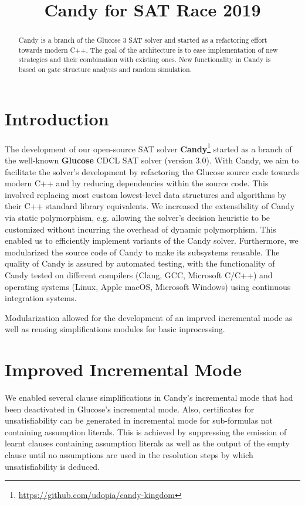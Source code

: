 \documentclass[conference]{IEEEtran}
\title{Candy for SAT Race 2019}
\author{\IEEEauthorblockN{Markus Iser\IEEEauthorrefmark{1}
and Felix Kutzner\IEEEauthorrefmark{2}}
\IEEEauthorblockA{Karlsruhe Institute of Technology (KIT)\\
Karlsruhe, Germany\\
\IEEEauthorrefmark{1}markus.iser@kit.edu,
\IEEEauthorrefmark{2}felix@kutzner.io}}
\begin{document}
\maketitle

\begin{abstract}
Candy is a branch of the Glucose 3 SAT solver and started as a refactoring effort towards modern C++.
The goal of the architecture is to ease implementation of new strategies and their combination with existing ones. 
New functionality in Candy is based on gate structure analysis and random simulation. 
\end{abstract}


\section{Introduction}
The development of our open-source SAT solver \textbf{Candy}\footnote{\url{https://github.com/udopia/candy-kingdom}} started as a branch of the well-known \textbf{Glucose} \cite{Audemard:2009:Glucose,Niklas:2003:Minisat} CDCL SAT solver (version 3.0).
With Candy, we aim to facilitate the solver's development by refactoring the Glucose source code towards modern C++ and by reducing dependencies within the source code.
This involved replacing most custom lowest-level data structures and algorithms by their C++ standard library equivalents.
We increased the extensibility of Candy via static polymorphism, e.g. allowing the solver's decision heuristic to be customized without incurring the overhead of dynamic polymorphism. 
This enabled us to efficiently implement variants of the Candy solver.
Furthermore, we modularized the source code of Candy to make its subsystems reusable.
The quality of Candy is assured by automated testing, with the functionality of Candy tested on different compilers (Clang, GCC, Microsoft C/C++) and operating systems (Linux, Apple macOS, Microsoft Windows) using continuous integration systems.

Modularization allowed for the development of an imprved incremental mode as well as reusing simplifications modules for basic inprocessing. 


\section{Improved Incremental Mode}
We enabled several clause simplifications in Candy's incremental mode that had been deactivated in Glucose's incremental mode.
Also, certificates for unsatisfiability can be generated in incremental mode for sub-formulas not containing assumption literals.
This is achieved by suppressing the emission of learnt clauses containing assumption literals as well as the output of the empty clause until no assumptions are used in the resolution steps by which unsatisfiability is deduced.
\end{document}

